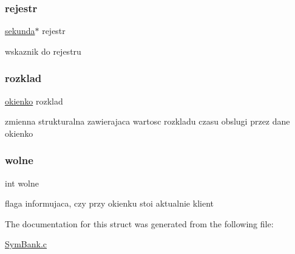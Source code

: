 \subsubsection{\texorpdfstring{rejestr}{rejestr}}
{\footnotesize\ttfamily \hyperlink{structsekunda}{sekunda}$\ast$ rejestr}

wskaznik do rejestru \mbox{\label{structkolejka_a6bf1b7b72ca4ecdd0436f324eb093e21}} 
\subsubsection{\texorpdfstring{rozklad}{rozklad}}
{\footnotesize\ttfamily \hyperlink{structokienko}{okienko} rozklad}

zmienna strukturalna zawierajaca wartosc rozkladu czasu obslugi przez dane okienko \mbox{\label{structkolejka_aadcbb166e915b47c745827535abc3a9f}} 
\subsubsection{\texorpdfstring{wolne}{wolne}}
{\footnotesize\ttfamily int wolne}

flaga informujaca, czy przy okienku stoi aktualnie klient 

The documentation for this struct was generated from the following file\+:\begin{DoxyCompactItemize}
\item 
\hyperlink{_sym_bank_8c}{Sym\+Bank.\+c}\end{DoxyCompactItemize}
